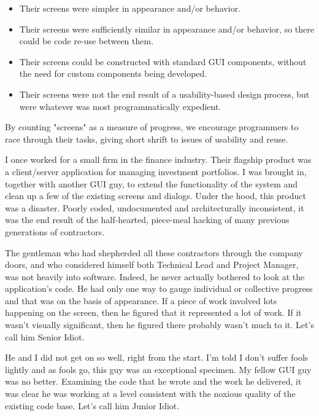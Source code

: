 \documentclass{article}
\begin{document}
\begin{enumerate}
\begin{enumerate}
\begin{itemize}
\item Their screens were simpler in appearance and/or behavior.
\item Their screens were sufficiently similar in appearance and/or
behavior, so there could be code re-use between them.\\
\item Their screens could be constructed with standard GUI components,
without the need for custom components being developed.\\
\item Their screens were not the end result of a usability-based design
process, but were whatever was most programmatically expedient.
\end{itemize}

By counting "screens" as a measure of progress, we encourage programmers
to race through their tasks, giving short shrift to issues of usability
and reuse.

I once worked for a small firm in the finance industry. Their flagship
product was a client/server application for managing investment
portfolios. I was brought in, together with another GUI guy, to extend
the functionality of the system and clean up a few of the existing
screens and dialogs. Under the hood, this product was a disaster. Poorly
coded, undocumented and architecturally inconsistent, it was the end
result of the half-hearted, piece-meal hacking of many previous
generations of contractors.

The gentleman who had shepherded all these contractors through the
company doors, and who considered himself both Technical Lead and
Project Manager, was not heavily into software. Indeed, he never
actually bothered to look at the application's code. He had only one way
to gauge individual or collective progress and that was on the basis of
appearance. If a piece of work involved lots happening on the screen,
then he figured that it represented a lot of work. If it wasn't visually
significant, then he figured there probably wasn't much to it. Let's
call him Senior Idiot.

He and I did not get on so well, right from the start. I'm told I don't
suffer fools lightly and as fools go, this guy was an exceptional
specimen. My fellow GUI guy was no better. Examining the code that he
wrote and the work he delivered, it was clear he was working at a level
consistent with the noxious quality of the existing code base. Let's
call him Junior Idiot.


\end{enumerate}
\end{enumerate}
\end{document}

